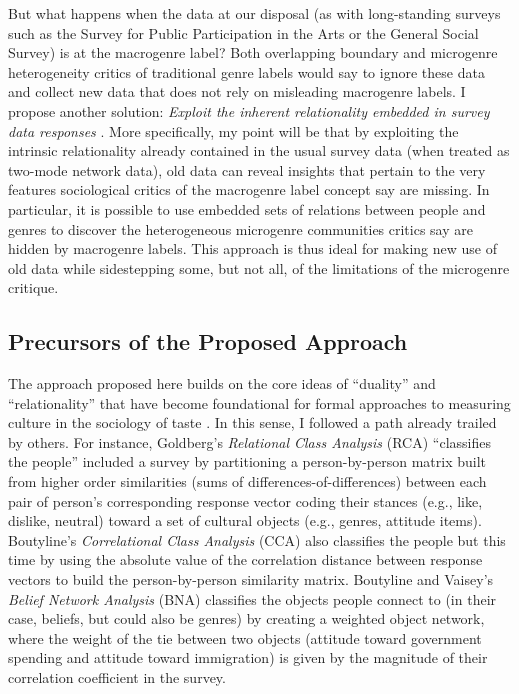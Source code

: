 \documentclass[a4paper,12pt]{extarticle}
\begin{document}
But what happens when the data at our disposal (as with long-standing surveys such as the Survey for Public Participation in the Arts or the General Social Survey) is at the macrogenre label? Both overlapping boundary and microgenre heterogeneity critics of traditional genre labels would say to ignore these data and collect new data that does not rely on misleading macrogenre labels. I propose another solution: {\em Exploit the inherent relationality embedded in survey data responses} \citep{goldberg2011mapping, boutyline2017belief, lizardo18}. More specifically, my point will be that by exploiting the intrinsic relationality already contained in the usual survey data (when treated as two-mode network data), old data can reveal insights that pertain to the very features sociological critics of the macrogenre label concept say are missing. In particular, it is possible to use embedded sets of relations between people and genres to discover the heterogeneous microgenre communities critics say are hidden by macrogenre labels. This approach is thus ideal for making new use of old data while sidestepping some, but not all, of the limitations of the microgenre critique. 	

\subsection{Precursors of the Proposed Approach}
The approach proposed here builds on the core ideas of ``duality'' and ``relationality'' that have become foundational for formal approaches to measuring culture in the sociology of taste \citep{mutzel2020duality, mohr2015formal}. In this sense, I followed a path already trailed by others. For instance, Goldberg's \citeyearpar{goldberg2011mapping} {\em Relational Class Analysis} (RCA) ``classifies the people''  included a survey by partitioning a person-by-person matrix built from higher order similarities (sums of differences-of-differences) between each pair of person's corresponding response vector coding their stances (e.g., like, dislike, neutral) toward a set of cultural objects (e.g., genres, attitude items). Boutyline's \citeyearpar{boutyline2017improving} {\em Correlational Class Analysis} (CCA) also classifies the people but this time by using the absolute value of the correlation distance between response vectors to build the person-by-person similarity matrix. Boutyline and Vaisey's {\em Belief Network Analysis} (BNA) classifies the objects people connect to (in their case, beliefs, but could also be genres) by creating a weighted object network, where the weight of the tie between two objects (attitude toward government spending and attitude toward immigration) is given by the magnitude of their correlation coefficient in the survey. 
\end{document}
